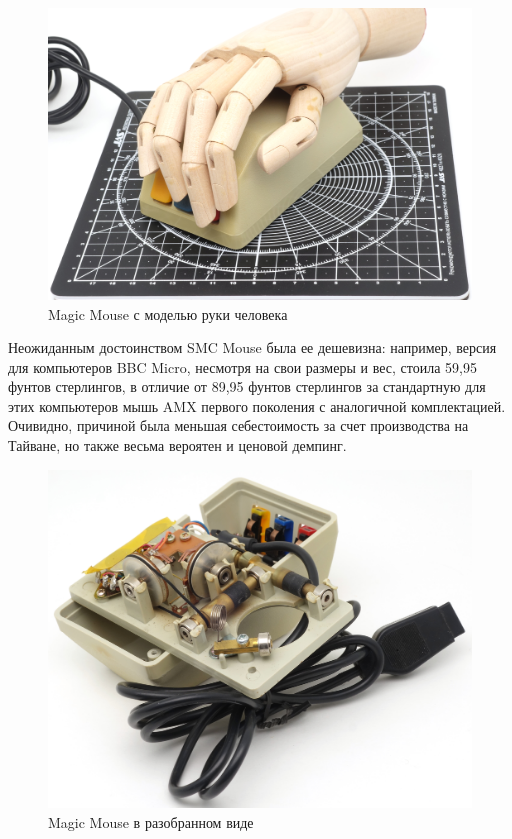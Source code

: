 \documentclass[11pt, a4paper]{article}
\begin{document}
\begin{figure}[h]
    \centering
    \includegraphics[scale=0.51]{1985_smc_contriver_magic_mouse/hand_30.jpg}
    \caption{Magic Mouse с моделью руки человека}
    \label{fig:MagicMouseHand}
\end{figure}

Неожиданным достоинством SMC Mouse была ее дешевизна: например, версия для компьютеров BBC Micro, несмотря на свои размеры и вес, стоила 59,95 фунтов стерлингов, в отличие от 89,95 фунтов стерлингов за стандартную для этих компьютеров мышь AMX первого поколения с аналогичной комплектацией. Очивидно, причиной была меньшая себестоимость за счет производства на Тайване, но также весьма вероятен и ценовой демпинг.

 \begin{figure}[h]
    \centering
    \includegraphics[scale=0.65]{1985_smc_contriver_magic_mouse/inside_30.jpg}
    \caption{Magic Mouse в разобранном виде}
    \label{fig:MagicMouseInside}
\end{figure}
\end{document}
